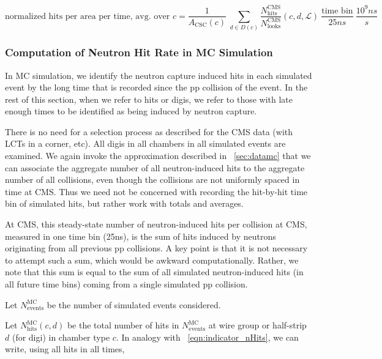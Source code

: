 \begin{equation}
    \label{eqn:hits_perA_perT_perCSC_Lumi}
\text{normalized hits per area per time, avg.\ over $c$} = 
    \frac{1}{A_\text{CSC}(c)}  \  \sum_{d\in D(c)}{\frac{{N}^\text{CMS}_\text{hits}}{N^\text{CMS}_{\text{looks}}}(c, d, \mathcal{L})}  \  \frac{\text{time bin}}{25\unit{ns}}  \  \frac{10^9\unit{ns}}{\unit{s}}
\end{equation}

\subsubsection{Computation of Neutron Hit Rate in MC Simulation}

In MC simulation, we identify the neutron capture induced hits in each
simulated event by the long time that is recorded since the pp
collision of the event.  In the rest of this section, when we refer to
hits or digis, we refer to those with late enough times to be
identified as being induced by neutron capture.

There is no need for a selection process as described for the CMS
data (with LCTs in a corner, etc).  All digis in all chambers in all
simulated events are examined.  We again invoke the approximation
described in \Sec~\ref{sec:datamc} that we can associate the aggregate
number of all neutron-induced hits to the aggregate number of all \pp
collisions, even though the \pp collisions are not uniformly spaced in
time at CMS.  Thus we need not be concerned with recording the
hit-by-hit time bin of simulated hits, but rather work with totals and
averages.


At CMS, this steady-state number of neutron-induced hits per \pp
collision at CMS, measured in one time bin (25\unit{ns}), is the sum
of hits induced by neutrons originating from all previous pp
collisions. A key point is that it is not necessary to attempt such a
sum, which would be awkward computationally.  Rather, we note that
this sum is equal to the sum of all simulated neutron-induced hits
(in all future time bins) coming from a single simulated pp collision.


Let $N_\text{events}^\text{MC}$ be the number of simulated events
considered.

Let $N_\text{hits}^\text{MC}(c, d)$ be the total number of hits in
$N^\text{MC}_\text{events}$ at wire group or half-strip $d$ (for digi)
in chamber type $c$. In analogy with \Eq~\ref{eqn:indicator_nHits}, we
can write, using all hits in all times,

